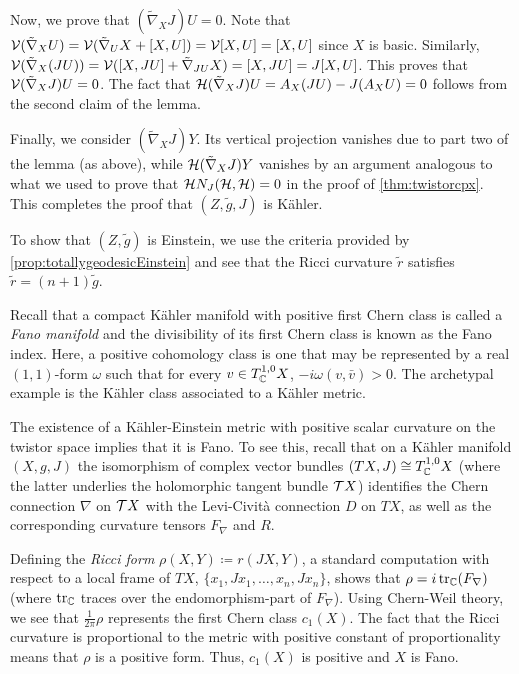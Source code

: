 \begin{myproof}
	Now, we prove that $(\tilde\nabla_XJ)U=0$. Note that $\mathcal{V}(\tilde\nabla_XU)=\mathcal{V}(\tilde\nabla_U X+[X,U])=\mathcal{V}[X,U]=[X,U]$ since $X$ is basic. Similarly, $\mathcal{V}(\tilde\nabla_X (JU))=\mathcal{V}([X,JU]+\tilde\nabla_{JU}X)=[X,JU]=J[X,U]$. This proves that $\mathcal{V}(\tilde\nabla_X J)U=0$. The fact that $\mathcal{H}(\tilde\nabla_XJ)U=A_X(JU)-J(A_X U)=0$ follows from the second claim of the lemma.
	
	Finally, we consider $(\tilde\nabla_XJ)Y$. Its vertical projection vanishes due to part two of the lemma (as above), while $\mathcal{H}(\tilde\nabla_XJ)Y$ vanishes by an argument analogous to what we used to prove that $\mathcal{H}N_J(\mathcal{H},\mathcal{H})=0$ in the proof of \cref{thm:twistorcpx}. This completes the proof that $(Z,\tilde g,J)$ is K\"ahler.
	
	To show that $(Z,\tilde g)$ is Einstein, we use the criteria provided by \cref{prop:totallygeodesicEinstein} and see that the Ricci curvature $\tilde r$ satisfies $\tilde r=(n+1)\tilde g$.
\end{myproof}

Recall that a compact K\"ahler manifold with positive first Chern class is called a \emph{Fano manifold} and the divisibility of its first Chern class is known as the Fano index. Here, a positive cohomology class is one that may be represented by a real $(1,1)$-form $\omega$ such that for every $v\in T^{1,0}_{\mathbb{C}} X$, $-i\omega(v,\bar v)>0$. The archetypal example is the K\"ahler class associated to a K\"ahler metric.

The existence of a K\"ahler-Einstein metric with positive scalar curvature on the twistor space implies that it is Fano. To see this, recall that on a K\"ahler manifold $(X,g,J)$ the isomorphism of complex vector bundles $(TX,J)\cong T^{1,0}_{\mathbb{C}} X$ (where the latter underlies the holomorphic tangent bundle $\mathcal{T}X$) identifies the Chern connection $\nabla$ on $\mathcal{T}X$ with the Levi-Civit\`a connection $D$ on $TX$, as well as the corresponding curvature tensors $F_\nabla$ and $R$. 

Defining the \emph{Ricci form} $\rho(X,Y)\coloneqq r(JX,Y)$, a standard computation with respect to a local frame of $TX$, $\{x_1,Jx_1,\dots,x_n,Jx_n\}$, shows that $\rho=i\operatorname{tr}_{\mathbb{C}} (F_\nabla)$ (where $\operatorname{tr}_{\mathbb{C}}$ traces over the endomorphism-part of $F_\nabla$). 
Using Chern-Weil theory, we see that $\frac{1}{2\pi}\rho$ represents the first Chern class $c_1(X)$. The fact that the Ricci curvature is proportional to the metric with positive constant of proportionality means that $\rho$ is a positive form. Thus, $c_1(X)$ is positive and $X$ is Fano.

